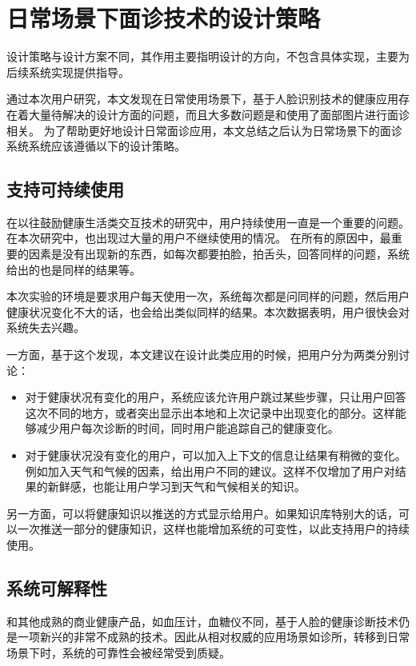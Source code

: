 \section{日常场景下面诊技术的设计策略}
设计策略与设计方案不同，其作用主要指明设计的方向，不包含具体实现，主要为后续系统实现提供指导。

通过本次用户研究，本文发现在日常使用场景下，基于人脸识别技术的健康应用存在着大量待解决的设计方面的问题，而且大多数问题是和使用了面部图片进行面诊相关。
为了帮助更好地设计日常面诊应用，本文总结之后认为日常场景下的面诊系统系统应该遵循以下的设计策略。

\subsection{支持可持续使用}
在以往鼓励健康生活类交互技术的研究中，用户持续使用一直是一个重要的问题\cite{Clawson2015No,Epstein2016Beyond}。在本次研究中，也出现过大量的用户不继续使用的情况。
在所有的原因中，最重要的因素是没有出现新的东西，如每次都要拍脸，拍舌头，回答同样的问题，系统给出的也是同样的结果等。

本次实验的环境是要求用户每天使用一次，系统每次都是问同样的问题，然后用户健康状况变化不大的话，也会给出类似同样的结果。本次数据表明，用户很快会对系统失去兴趣。

一方面，基于这个发现，本文建议在设计此类应用的时候，把用户分为两类分别讨论：
\begin{itemize}

    \item 对于健康状况有变化的用户，系统应该允许用户跳过某些步骤，只让用户回答这次不同的地方，或者突出显示出本地和上次记录中出现变化的部分。这样能够减少用户每次诊断的时间，同时用户能追踪自己的健康变化。

    \item 对于健康状况没有变化的用户，可以加入上下文的信息让结果有稍微的变化。例如加入天气和气候的因素，给出用户不同的建议。这样不仅增加了用户对结果的新鲜感，也能让用户学习到天气和气候相关的知识。

\end{itemize}

另一方面，可以将健康知识以推送的方式显示给用户。如果知识库特别大的话，可以一次推送一部分的健康知识，这样也能增加系统的可变性，以此支持用户的持续使用。

\subsection{系统可解释性}

和其他成熟的商业健康产品，如血压计，血糖仪不同，基于人脸的健康诊断技术仍是一项新兴的非常不成熟的技术。因此从相对权威的应用场景如诊所，转移到日常场景下时，系统的可靠性会被经常受到质疑。

